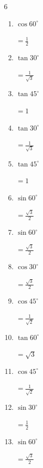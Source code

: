 \begin{multicols}{6}
\begin{enumerate}
  \item $\displaystyle \cos{60^\circ}$

        $\displaystyle =\frac{1}{2}$

\columnbreak %

  \item $\displaystyle \tan{30^\circ}$

        $\displaystyle =\frac{1}{\sqrt{3}}$

  \item $\displaystyle \tan{45^\circ}$

        $\displaystyle =1$

  \item $\displaystyle \tan{30^\circ}$

        $\displaystyle =\frac{1}{\sqrt{3}}$

  \item $\displaystyle \tan{45^\circ}$

        $\displaystyle =1$

  \item $\displaystyle \sin{60^\circ}$

        $\displaystyle =\frac{\sqrt{3}}{2}$

  \item $\displaystyle \sin{60^\circ}$

        $\displaystyle =\frac{\sqrt{3}}{2}$

  \item $\displaystyle \cos{30^\circ}$

        $\displaystyle =\frac{\sqrt{3}}{2}$

  \item $\displaystyle \cos{45^\circ}$

        $\displaystyle =\frac{1}{\sqrt{2}}$

  \item $\displaystyle \tan{60^\circ}$

        $\displaystyle =\sqrt{3}$

  \item $\displaystyle \cos{45^\circ}$

        $\displaystyle =\frac{1}{\sqrt{2}}$

  \item $\displaystyle \sin{30^\circ}$

        $\displaystyle =\frac{1}{2}$

  \item $\displaystyle \sin{60^\circ}$

        $\displaystyle =\frac{\sqrt{3}}{2}$


\end{enumerate}
\end{multicols}

